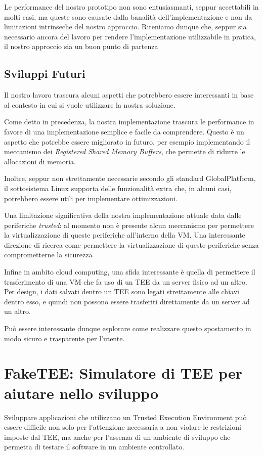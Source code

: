 \documentclass[12pt,italian]{report}
\begin{document}
Le performance del nostro prototipo non sono entusiasmanti, seppur accettabili
in molti casi, ma queste sono causate dalla banalità dell'implementazione e
non da limitazioni intrinseche del nostro approccio.
Riteniamo dunque che, seppur sia necessario ancora del lavoro per rendere
l'implementazione utilizzabile in pratica, il nostro approccio sia un buon
punto di partenza

\section{Sviluppi Futuri}
\label{sec:sviluppi-futuri}
Il nostro lavoro trascura alcuni aspetti che potrebbero essere interessanti
in base al contesto in cui si vuole utilizzare la nostra soluzione.

Come detto in precedenza, la nostra implementazione trascura le performance in
favore di una implementazione semplice e facile da comprendere.
Questo è un aspetto che potrebbe essere migliorato in futuro, per esempio
implementando il meccanismo dei \textit{Registered Shared Memory Buffers},
che permette di ridurre le allocazioni di memoria.

Inoltre, seppur non strettamente necessarie secondo gli standard GlobalPlatform,
il sottosistema Linux supporta delle funzionalità extra che, in alcuni casi,
potrebbero essere utili per implementare ottimizzazioni.

\bigbreak \noindent

Una limitazione significativa della nostra implementazione attuale data dalle
periferiche \textit{trusted}: al momento non è presente alcun meccanismo per
permettere la virtualizzazione di queste periferiche all'interno della VM.
Una interessante direzione di ricerca come permettere la virtualizzazione
di queste periferiche senza comprometterne la sicurezza

\bigbreak \noindent

Infine in ambito cloud computing, una sfida interessante è quella di permettere
il trasferimento di una VM che fa uso di un TEE da un server fisico ad un altro.
Per design, i dati salvati dentro un TEE sono legati strettamente alle chiavi
dentro esso, e quindi non possono essere trasferiti direttamente da un
server ad un altro.

Può essere interessante dunque esplorare come realizzare questo spostamento
in modo sicuro e trasparente per l'utente.

\appendix
\chapter{FakeTEE: Simulatore di TEE per aiutare nello sviluppo}
\label{app:faketee}
Sviluppare applicazioni che utilizzano un Trusted Execution Environment può
essere difficile non solo per l'attenzione necessaria a non violare
le restrizioni imposte dal TEE, ma anche per l'assenza di un ambiente di
sviluppo che permetta di testare il software in un ambiente controllato.
\end{document}
